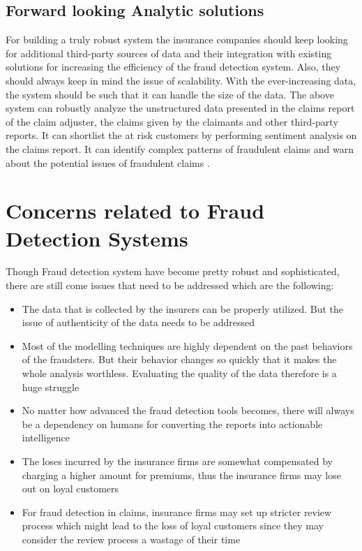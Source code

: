 \documentclass[sigconf]{acmart}
\begin{document}
\subsection{Forward looking Analytic solutions}
For building a truly robust system the insurance companies should keep looking for additional third-party sources of data and their integration with existing solutions for increasing the efficiency of the fraud detection system. Also, they should always keep in mind the issue of scalability. With the ever-increasing data, the system should be such that it can handle the size of the data.
The above system can robustly analyze the unstructured data presented in the claims report of the claim adjuster, the claims given by the claimants and other third-party reports. It can shortlist the at risk customers by performing sentiment analysis on the claims report. It can identify complex patterns of fraudulent claims and warn about the potential issues of fraudulent claims \cite{link7}.

\section{Concerns related to Fraud Detection Systems}
Though Fraud detection system have become pretty robust and sophisticated, there are still come issues that need to be addressed which are the following:
\begin{itemize}
  \item The data that is collected by the insurers can be properly utilized. But the issue of authenticity of the data needs to be addressed
  \item Most of the modelling techniques are highly dependent on the past behaviors of the fraudsters. But their behavior changes so quickly that it makes the whole analysis worthless. Evaluating the quality of the data therefore is a huge struggle
  \item No matter how advanced the fraud detection tools becomes, there will always be a dependency on humans for converting the reports into actionable intelligence
  \item The loses incurred by the insurance firms are somewhat compensated by charging a higher amount for premiums, thus the insurance firms may lose out on loyal customers
  \item For fraud detection in claims, insurance firms may set up stricter review process which might lead to the loss of loyal customers since they may consider the review process a wastage of their time\cite{link8}
\end{itemize} 
\end{document}
